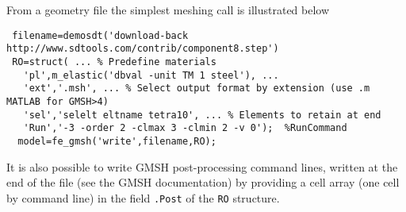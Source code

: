 From a geometry file the simplest meshing call is illustrated below

\begin{verbatim}
 filename=demosdt('download-back http://www.sdtools.com/contrib/component8.step')
 RO=struct( ... % Predefine materials
   'pl',m_elastic('dbval -unit TM 1 steel'), ...
   'ext','.msh', ... % Select output format by extension (use .m MATLAB for GMSH>4)
   'sel','selelt eltname tetra10', ... % Elements to retain at end
   'Run','-3 -order 2 -clmax 3 -clmin 2 -v 0');  %RunCommand
  model=fe_gmsh('write',filename,RO);
\end{verbatim}%

It is also possible to write GMSH post-processing command lines, written at the end of the file (see the GMSH documentation) by providing a cell array (one cell by command line) in the field {\tt .Post} of the {\tt RO} structure.




